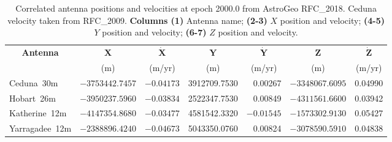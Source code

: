 			\begin{table}[h]
				\footnotesize
				\centering
				\caption[MV02* antenna positions and velocities]{Correlated antenna positions and velocities at epoch 2000.0 from AstroGeo RFC\_2018. Ceduna velocity taken from  RFC\_2009. \textbf{Columns (1)} Antenna name; \textbf{(2-3)} $X$ position and velocity; \textbf{(4-5)} $Y$ position and velocity; \textbf{(6-7)} $Z$ position and velocity.}
				{\onehalfspacing
					\begin{tabular}{lrrrrrr} \hline
						\multicolumn{1}{c}{\bf Antenna} & \multicolumn{1}{c}{$\boldsymbol{X}$} & \multicolumn{1}{c}{$\boldsymbol{\dot X}$} & \multicolumn{1}{c}{$\boldsymbol{Y}$} & \multicolumn{1}{c}{$\boldsymbol{\dot Y}$} & \multicolumn{1}{c}{$\boldsymbol{Z}$} & \multicolumn{1}{c}{$\boldsymbol{\dot Z}$} \\ 
						\multicolumn{1}{c}{} & \multicolumn{1}{c}{(m)} & \multicolumn{1}{c}{(m/yr)} & \multicolumn{1}{c}{(m)} & \multicolumn{1}{c}{(m/yr)} & \multicolumn{1}{c}{(m)} & \multicolumn{1}{c}{(m/yr)} \\
						\hline
						Ceduna~30m     & $-3753442.7457$  & $-0.04173$  &  3912709.7530 & 0.00267     &  $-3348067.6095$  & 0.04990  \\
						Hobart~26m     & $-3950237.5960$  & $-0.03834$  &  2522347.7530 & 0.00849     &  $-4311561.6600$  & 0.03942  \\
						Katherine~12m  & $-4147354.8680$  & $-0.03477$  &  4581542.3320 & $-0.01545$  &  $-1573302.9130$  & 0.05427  \\
						Yarragadee~12m & $-2388896.4240$  & $-0.04673$  &  5043350.0760 & 0.00824     &  $-3078590.5910$  & 0.04838  \\
						
						\hline
					\end{tabular}}
					\label{antennapositions}
				\end{table}		
				
